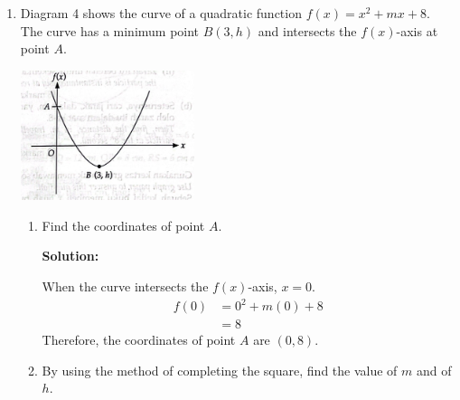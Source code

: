 \documentclass{report}
\newcommand{\sol}{\textbf{Solution:}}
\begin{document}
\begin{enumerate}[leftmargin=*]
\begin{enumerate}
              \item Diagram 4 shows the curve of a quadratic function $f(x)=x^2+m x+8$. The curve
                    has a minimum point $B(3, h)$ and intersects the $f(x)$-axis at point $A$.
                    \begin{center}
                        \includegraphics[width=0.4\textwidth]{./assets/11b.png}
                    \end{center}
                    \begin{enumerate}
                        \item Find the coordinates of point $A$.

                              \sol{}

                              When the curve intersects the $f(x)$-axis, $x=0$.
                              \begin{align*}
                                  f(0) & = 0^2 + m(0) + 8 \\
                                       & = 8
                              \end{align*}
                              Therefore, the coordinates of point $A$ are $(0,8)$.

                        \item By using the method of completing the square, find the value of $m$ and of $h$. 


\end{enumerate}
\end{enumerate}
\end{enumerate}
\end{document}
